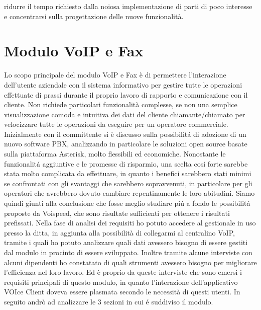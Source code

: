 ridurre il tempo richiesto dalla noiosa implementazione di parti di poco interesse  e concentrarsi sulla progettazione delle nuove funzionalit\`a.

\section{Modulo VoIP e Fax}
Lo scopo principale del modulo VoIP e Fax \`e di permettere l'interazione dell'utente aziendale con il sistema informativo per gestire tutte le operazioni effettuate di prassi durante il proprio lavoro di rapporto e comunicazione con il cliente. Non richiede particolari funzionalit\`a complesse, se non una semplice visualizzazione comoda e intuitiva dei dati del cliente chiamante/chiamato per velocizzare tutte le operazioni da eseguire per un operatore commerciale. Inizialmente con il committente si \`e discusso sulla possibilit\'a di adozione di un nuovo software PBX, analizzando in particolare le soluzioni open source basate sulla piattaforma Asterisk, molto flessibili ed economiche. Nonostante le funzionalit\'a aggiuntive e le promesse di risparmio, una scelta cos\'i forte sarebbe stata molto complicata da effettuare, in quanto i benefici sarebbero stati minimi se confrontati con gli svantaggi che sarebbero sopravvenuti, in particolare per gli operatori che avrebbero dovuto cambiare repentinamente le loro abitudini. Siamo quindi giunti alla conclusione che fosse meglio studiare pi\'u a fondo le possibilit\'a proposte da Voispeed, che sono risultate sufficienti per ottenere i risultati prefissati. Nella fase di analisi dei requisiti ho potuto accedere al gestionale in uso presso la ditta, in aggiunta alla possibilit\`a di collegarmi al centralino VoIP, tramite i quali ho potuto analizzare quali dati avessero bisogno di essere gestiti dal modulo in procinto di essere sviluppato. Inoltre tramite alcune interviste con alcuni dipendenti ho constatato di quali strumenti avessero bisogno per migliorare l'efficienza nel loro lavoro. Ed \`e proprio da queste interviste che sono emersi i requisiti principali di questo modulo, in quanto l'interazione dell'applicativo VOIce Client doveva essere plasmata secondo le necessit\`a di questi utenti. In seguito andr\`o ad analizzare le 3 sezioni in cui \'e suddiviso il modulo.

\newpage
